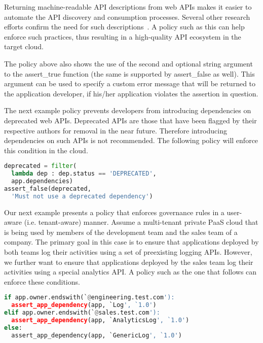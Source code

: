 Returning machine-readable API descriptions from web APIs 
makes it easier to automate the API discovery and consumption processes. Several other
research efforts confirm the need for such descriptions~\cite{Verborgh:2012:FDB:2307819.2307828,Steiner:2011:FHC:1967428.1967433}. 
A policy such as this
can help enforce such practices, thus resulting in a high-quality
API ecosystem in the target cloud. 

The policy above also shows the use of the second and
optional string argument to 
the assert\_true function (the same is supported by assert\_false as well). 
This argument can be used to specify
a custom error message that will be returned to the application developer, if his/her application
violates the assertion in question.

The next example policy prevents developers from introducing
dependencies on deprecated web APIs. Deprecated APIs 
are those that have been flagged
by their respective authors for removal 
in the near future. Therefore introducing dependencies on such
APIs is not recommended. The following policy will 
enforce this condition in the cloud.

\vspace{0.05in}
{\footnotesize
\begin{lstlisting}[language=Python, frame=single, showstringspaces=false]
deprecated = filter(
  lambda dep : dep.status == 'DEPRECATED', 
  app.dependencies)
assert_false(deprecated, 
  'Must not use a deprecated dependency')
\end{lstlisting}
}
\vspace{0.05in}

Our next example presents a policy that enforces governance 
rules in a user-aware (i.e. tenant-aware) manner. Assume
a multi-tenant private PaaS cloud that is being 
used by members of the development
team and the sales team of a company. The primary goal in this case
is to ensure that applications deployed by both teams
log their activities using a set of preexisting logging APIs. 
However, we further want to ensure that applications
deployed by the sales team log their activities using 
a special analytics API. A policy such as the one
that follows can enforce these conditions.

\vspace{0.05in}
{\footnotesize
\begin{lstlisting}[language=Python, frame=single, showstringspaces=false]
if app.owner.endswith(`@engineering.test.com'):
  assert_app_dependency(app, `Log', `1.0')
elif app.owner.endswith(`@sales.test.com'):
  assert_app_dependency(app, `AnalyticsLog', `1.0')
else:
  assert_app_dependency(app, `GenericLog', `1.0')
\end{lstlisting}
}
\vspace{0.05in} 

